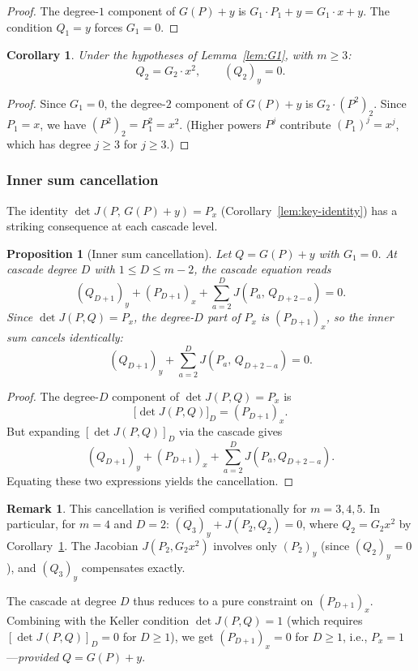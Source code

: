 \documentclass[12pt,a4paper]{article}
\newtheorem{proposition}[theorem]{Proposition}
\newtheorem{corollary}[theorem]{Corollary}
\theoremstyle{definition}
\newtheorem{remark}[theorem]{Remark}
\begin{document}
\begin{proof}
The degree-$1$ component of $G(P) + y$ is $G_1 \cdot P_1 + y = G_1 \cdot x + y$.
The condition $Q_1 = y$ forces $G_1 = 0$.
\end{proof}

\begin{corollary}\label{cor:Q2-pure-x}
Under the hypotheses of Lemma~\ref{lem:G1}, with $m \geq 3$:
\[
  Q_2 = G_2 \cdot x^2, \qquad (Q_2)_y = 0.
\]
\end{corollary}

\begin{proof}
Since $G_1 = 0$, the degree-$2$ component of $G(P) + y$ is
$G_2 \cdot (P^2)_2$. Since $P_1 = x$, we have
$(P^2)_2 = P_1^2 = x^2$. (Higher powers $P^j$ contribute
$(P_1)^j = x^j$, which has degree $j \geq 3$ for $j \geq 3$.)
\end{proof}

\subsubsection*{Inner sum cancellation}

The identity $\det J(P,\, G(P) + y) = P_x$
(Corollary~\ref{lem:key-identity}) has a striking consequence at each
cascade level.

\begin{proposition}[Inner sum cancellation]\label{prop:inner-cancel}
Let $Q = G(P) + y$ with $G_1 = 0$. At cascade degree $D$ with
$1 \leq D \leq m - 2$, the cascade equation reads
\[
  (Q_{D+1})_y + (P_{D+1})_x +
  \sum_{a=2}^{D} J(P_a,\, Q_{D+2-a}) = 0.
\]
Since $\det J(P, Q) = P_x$, the degree-$D$ part of $P_x$ is
$(P_{D+1})_x$, so the inner sum cancels identically:
\[
  (Q_{D+1})_y + \sum_{a=2}^{D} J(P_a,\, Q_{D+2-a}) = 0.
\]
\end{proposition}

\begin{proof}
The degree-$D$ component of $\det J(P,Q) = P_x$ is
\[
  \bigl[\det J(P,Q)\bigr]_D = (P_{D+1})_x.
\]
But expanding $[\det J(P,Q)]_D$ via the cascade gives
\[
  (Q_{D+1})_y + (P_{D+1})_x + \sum_{a=2}^{D} J(P_a, Q_{D+2-a}).
\]
Equating these two expressions yields the cancellation.
\end{proof}

\begin{remark}
This cancellation is verified computationally for $m = 3, 4, 5$.
In particular, for $m = 4$ and $D = 2$:
$(Q_3)_y + J(P_2, Q_2) = 0$, where $Q_2 = G_2 x^2$ by
Corollary~\ref{cor:Q2-pure-x}. The Jacobian $J(P_2, G_2 x^2)$
involves only $(P_2)_y$ (since $(Q_2)_y = 0$), and $(Q_3)_y$
compensates exactly.

The cascade at degree $D$ thus reduces to a pure constraint on
$(P_{D+1})_x$. Combining with the Keller condition
$\det J(P,Q) = 1$ (which requires $[\det J(P,Q)]_D = 0$ for
$D \geq 1$), we get $(P_{D+1})_x = 0$ for $D \geq 1$, i.e.,
$P_x = 1$---\emph{provided} $Q = G(P) + y$.
\end{remark}
\end{document}
